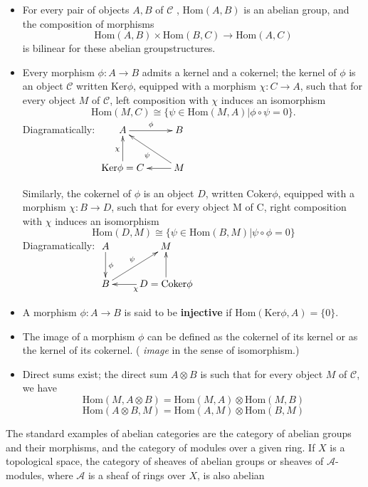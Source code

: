 \documentclass{article}
\numberwithin{equation}{subsection} %
\theoremstyle{definition}
\begin{document}
\begin{itemize}
	\item
	For every pair of objects $A, B$ of $\mathcal{C}$ , Hom$(A, B)$
	is an abelian group, and the composition of morphisms
	$$ \text{Hom} (A, B) \times \text{Hom} (B, C) \to \text{Hom} (A, C) $$
	is bilinear for these abelian groupstructures.

	\item
	Every morphism $\phi : A\to B$ admits a kernel and a cokernel;
	the kernel of
	$\phi$ is an object $\mathcal{C}$ written Ker$\phi$, 
	equipped with a morphism $\chi: C \to A$, such
	that for every object $M$ of $\mathcal{C}$, left composition with $\chi$
	induces an isomorphism
	$$\text{Hom}(M,C)\cong \{\psi\in\text{Hom}(M,A)|\phi\circ\psi = 0\}. $$
	Diagramatically:
	$\xymatrix{
	A \ar[r]^\phi & B \\
	\text{Ker}\phi=C \ar[u]^\chi & M \ar[l]\ar[ul]^\psi
	}$
	
	Similarly, the cokernel of $\phi$ is an object $D$, written Coker$\phi$,
	equipped with a
	morphism $\chi:B\to D$, such that for every object M of C, right composition
	with $\chi$ induces an isomorphism
	$$\text{Hom}(D,M)\cong \{\psi\in \text{Hom}(B,M)|\psi\circ\phi=0\}$$
	Diagramatically:
	$\xymatrix{
	A \ar[d]^\phi 			& M \\
	B \ar[ur]^\psi 	& D=\text{Coker}\phi \ar[l]^\chi \ar[u]
	}$

	\item
	A morphism $\phi: A\to B$ is said to be \textbf{injective} if $\text{Hom}(\text{Ker}\phi,A) = \{0\}$.
	\item
	The image of a morphism $\phi$ can be defined as the cokernel of
	its kernel or as the kernel of its cokernel. ( \textit{image} in
	the sense of isomorphism.)
	
	\item
	Direct sums exist; the direct sum $A\otimes B$ is such that for
	every object $M$ of $\mathcal{C}$, we have
	$$ \text{Hom}(M,A\otimes B)=\text{Hom}(M,A)\otimes \text{Hom}(M,B)$$
	$$ \text{Hom}(A\otimes B,M)=\text{Hom}(A,M)\otimes \text{Hom}(B,M)$$
\end{itemize}

The standard examples of abelian categories are the category of abelian groups
and their morphisms, and the category of modules over a given ring. If $X$ is
a topological space, the category of sheaves of abelian groups or sheaves of
$\mathcal{A}$-modules, where $\mathcal{A}$ is a sheaf of rings over $X$, 
is also abelian
\end{document}
